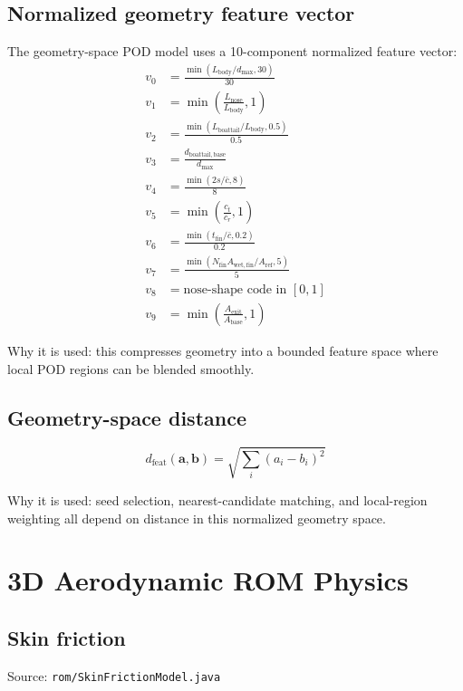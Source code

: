 \documentclass[11pt]{article}
\begin{document}
\subsection{Normalized geometry feature vector}
The geometry-space POD model uses a 10-component normalized feature vector:
\begin{align*}
v_0 &= \frac{\min(L_{\mathrm{body}}/d_{\max},30)}{30} \\
v_1 &= \min\!\left(\frac{L_{\mathrm{nose}}}{L_{\mathrm{body}}},1\right) \\
v_2 &= \frac{\min(L_{\mathrm{boattail}}/L_{\mathrm{body}},0.5)}{0.5} \\
v_3 &= \frac{d_{\mathrm{boattail,base}}}{d_{\max}} \\
v_4 &= \frac{\min(2s/\bar c,8)}{8} \\
v_5 &= \min\!\left(\frac{c_t}{c_r},1\right) \\
v_6 &= \frac{\min(t_{\mathrm{fin}}/\bar c,0.2)}{0.2} \\
v_7 &= \frac{\min(N_{\mathrm{fin}}A_{\mathrm{wet,fin}}/A_{\mathrm{ref}},5)}{5} \\
v_8 &= \text{nose-shape code in }[0,1] \\
v_9 &= \min\!\left(\frac{A_{\mathrm{exit}}}{A_{\mathrm{base}}},1\right)
\end{align*}

Why it is used: this compresses geometry into a bounded feature space where local POD regions can be blended smoothly.

\subsection{Geometry-space distance}
\begin{equation*}
d_{\mathrm{feat}}(\mathbf a,\mathbf b)=\sqrt{\sum_i (a_i-b_i)^2}
\end{equation*}

Why it is used: seed selection, nearest-candidate matching, and local-region weighting all depend on distance in this normalized geometry space.

\section{3D Aerodynamic ROM Physics}
\subsection{Skin friction}
Source: \texttt{rom/SkinFrictionModel.java}
\end{document}
